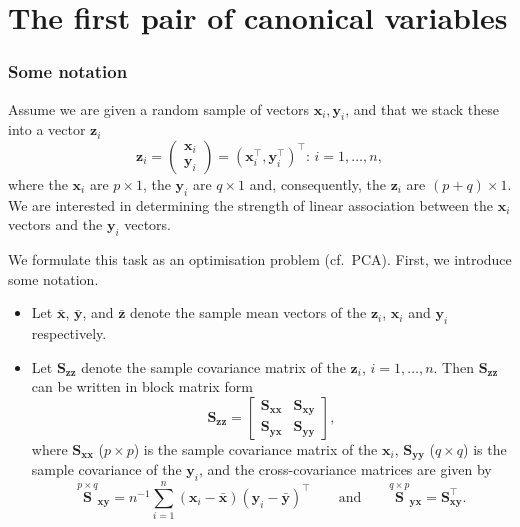 \documentclass[]{book}
\theoremstyle{definition}
\theoremstyle{definition}
\theoremstyle{definition}
\theoremstyle{remark}
\begin{document}
\hypertarget{cca1}{%
\section{The first pair of canonical variables}\label{cca1}}

\hypertarget{some-notation}{%
\subsubsection*{Some notation}\label{some-notation}}

Assume we are given a random sample of vectors \(\boldsymbol x_i, \boldsymbol y_i\), and that we stack these into a vector \(\boldsymbol z_i\)
\[
\boldsymbol z_i=\left(\begin{array}{c}
\boldsymbol x_i\\
\boldsymbol y_i
\end{array}\right)=(\boldsymbol x_i^\top , \boldsymbol y_i^\top )^\top: \, i=1,\ldots, n,
\]
where
the \(\boldsymbol x_i\) are \(p \times 1\), the \(\boldsymbol y_i\) are \(q \times 1\) and, consequently, the \(\boldsymbol z_i\) are \((p+q)\times 1\). We are interested in determining the strength of linear association between the \(\boldsymbol x_i\) vectors and the \(\boldsymbol y_i\) vectors.

We formulate this task as an optimisation problem (cf.~PCA). First, we introduce some notation.

\begin{itemize}
\item
  Let \(\bar{\boldsymbol x}\), \(\bar{\boldsymbol y}\), and \(\bar{\boldsymbol z}\) denote the sample mean vectors of the \(\boldsymbol z_i\), \(\boldsymbol x_i\) and \(\boldsymbol y_i\) respectively.
\item
  Let \(\boldsymbol S_{\boldsymbol z\boldsymbol z}\) denote the sample covariance matrix of the \(\boldsymbol z_i\), \(i=1,\ldots, n\). Then \(\boldsymbol S_{\boldsymbol z\boldsymbol z}\) can be written in block matrix form
  \[
  \boldsymbol S_{\boldsymbol z\boldsymbol z}=\left [\begin{array}{cc}
  \boldsymbol S_{\boldsymbol x\boldsymbol x} & \boldsymbol S_{\boldsymbol x\boldsymbol y}\\
  \boldsymbol S_{\boldsymbol y\boldsymbol x} & \boldsymbol S_{\boldsymbol y\boldsymbol y} \end{array} \right ],
  \]
  where \(\boldsymbol S_{\boldsymbol x\boldsymbol x}\) (\(p \times p\)) is the sample covariance matrix of the \(\boldsymbol x_i\), \(\boldsymbol S_{\boldsymbol y\boldsymbol y}\) (\(q \times q\)) is the sample covariance of the \(\boldsymbol y_i\), and the cross-covariance matrices are given by
  \[
  \stackrel{p \times q}{\boldsymbol S}_{\boldsymbol x\boldsymbol y}=n^{-1} \sum_{i=1}^n (\boldsymbol x_i -\bar{\boldsymbol x})(\boldsymbol y_i-\bar{\boldsymbol y})^\top
  \qquad \text{and} \qquad \stackrel{q \times p}{\boldsymbol S}_{\boldsymbol y\boldsymbol x}=\boldsymbol S_{\boldsymbol x\boldsymbol y}^\top.
  \]
\end{itemize}
\end{document}
